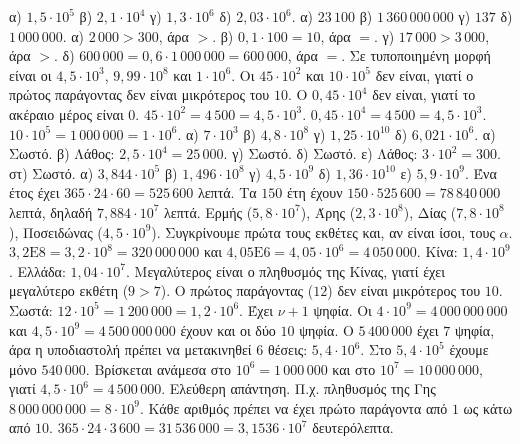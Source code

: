 α) $1{,}5\cdot10^{5}$ \quad β) $2{,}1\cdot10^{4}$ \quad γ) $1{,}3\cdot10^{6}$ \quad δ) $2{,}03\cdot10^{6}$.
 α) $23\,100$ \quad β) $1\,360\,000\,000$ \quad γ) $137$ \quad δ) $1\,000\,000$.
 α) $2\,000>300$, άρα $>$. β) $0{,}1\cdot100=10$, άρα $=$. γ) $17\,000>3\,000$, άρα $>$. δ) $600\,000=0{,}6\cdot1\,000\,000=600\,000$, άρα $=$.
 Σε τυποποιημένη μορφή είναι οι $4{,}5\cdot10^{3}$, $9{,}99\cdot10^{8}$ και $1\cdot10^{6}$. Οι $45\cdot10^2$ και $10\cdot10^5$ δεν είναι, γιατί ο πρώτος παράγοντας δεν είναι μικρότερος του $10$. Ο $0{,}45\cdot10^4$ δεν είναι, γιατί το ακέραιο μέρος είναι $0$.
 $45\cdot10^{2}=4\,500=4{,}5\cdot10^{3}$. $0{,}45\cdot10^{4}=4\,500=4{,}5\cdot10^{3}$. $10\cdot10^{5}=1\,000\,000=1\cdot10^{6}$.
 α) $7\cdot10^{3}$ \quad β) $4{,}8\cdot10^{8}$ \quad γ) $1{,}25\cdot10^{10}$ \quad δ) $6{,}021\cdot10^{6}$.
 α) Σωστό. β) Λάθος: $2{,}5\cdot10^{4}=25\,000$. γ) Σωστό. δ) Σωστό. ε) Λάθος: $3\cdot10^{2}=300$. στ) Σωστό.
 α) $3{,}844\cdot10^{5}$ \quad β) $1{,}496\cdot10^{8}$ \quad γ) $4{,}5\cdot10^{9}$ \quad δ) $1{,}36\cdot10^{10}$ \quad ε) $5{,}9\cdot10^{9}$.
 Ένα έτος έχει $365\cdot24\cdot60=525\,600$ λεπτά. Τα $150$ έτη έχουν $150\cdot525\,600=78\,840\,000$ λεπτά, δηλαδή $7{,}884\cdot10^{7}$ λεπτά.
 Ερμής ($5{,}8\cdot10^{7}$), Άρης ($2{,}3\cdot10^{8}$), Δίας ($7{,}8\cdot10^{8}$), Ποσειδώνας ($4{,}5\cdot10^{9}$). Συγκρίνουμε πρώτα τους εκθέτες και, αν είναι ίσοι, τους $\alpha$.
 $3{,}2\mathrm{E}8=3{,}2\cdot10^{8}=320\,000\,000$ και $4{,}05\mathrm{E}6=4{,}05\cdot10^{6}=4\,050\,000$.
 Κίνα: $1{,}4\cdot10^{9}$. Ελλάδα: $1{,}04\cdot10^{7}$. Μεγαλύτερος είναι ο πληθυσμός της Κίνας, γιατί έχει μεγαλύτερο εκθέτη ($9>7$).
 Ο πρώτος παράγοντας ($12$) δεν είναι μικρότερος του $10$. Σωστά: $12\cdot10^{5}=1\,200\,000=1{,}2\cdot10^{6}$.
 Έχει $\nu+1$ ψηφία. Οι $4\cdot10^{9}=4\,000\,000\,000$ και $4{,}5\cdot10^{9}=4\,500\,000\,000$ έχουν και οι δύο $10$ ψηφία.
 Ο $5\,400\,000$ έχει $7$ ψηφία, άρα η υποδιαστολή πρέπει να μετακινηθεί $6$ θέσεις: $5{,}4\cdot10^{6}$. Στο $5{,}4\cdot10^{5}$ έχουμε μόνο $540\,000$.
 Βρίσκεται ανάμεσα στο $10^{6}=1\,000\,000$ και στο $10^{7}=10\,000\,000$, γιατί $4{,}5\cdot10^{6}=4\,500\,000$.
 Ελεύθερη απάντηση. Π.χ. πληθυσμός της Γης $8\,000\,000\,000=8\cdot10^{9}$. Κάθε αριθμός πρέπει να έχει πρώτο παράγοντα από $1$ ως κάτω από $10$.
 $365\cdot24\cdot3\,600=31\,536\,000=3{,}1536\cdot10^{7}$ δευτερόλεπτα.
